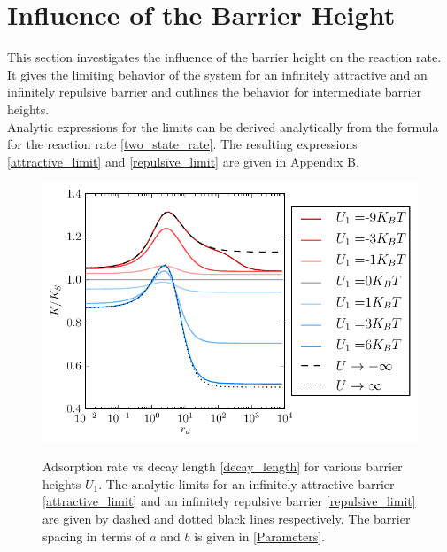 \section{Influence of the Barrier Height}
This section investigates the influence of the barrier height on the reaction rate. It gives the limiting behavior of the system for an infinitely attractive and an infinitely repulsive barrier and outlines the behavior for intermediate barrier heights.\\
Analytic expressions for the limits can be derived analytically from the formula for the reaction rate \eqref{two_state_rate}. The resulting expressions \eqref{attractive_limit} and \eqref{repulsive_limit} are given in Appendix B.
\vspace{-0.1 cm} \\
\begin{minipage}[t]{.69 \textwidth}
\begin{figure}[H]
    \centering
    \hspace{-1 cm}\includegraphics[width = 1.1 \textwidth]{plots/u1_dependence}
\end{figure}
\end{minipage} \hspace{0.01 \textwidth} \begin{minipage}[t]{.3 \textwidth}
    \begin{figure}[H]
        \caption{Adsorption rate vs decay length \eqref{decay_length} for various barrier heights $U_1$. The analytic limits for an infinitely attractive barrier \eqref{attractive_limit} and an infinitely repulsive barrier \eqref{repulsive_limit} are given by dashed and dotted black lines respectively. The barrier spacing in terms of $a$ and $b$ is given in \ref{Parameters}. \label{u1_dependence}}
    \end{figure}
\end{minipage}
\vspace{0.4 cm}

